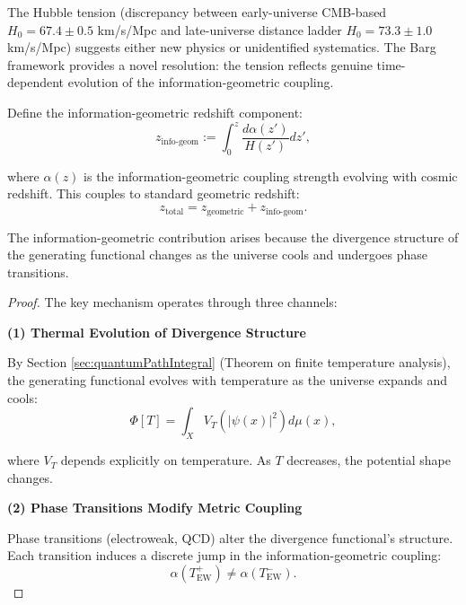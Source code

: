 \begin{theorem}
\label{thm:hubbleTensionResolution}

The Hubble tension (discrepancy between early-universe CMB-based $H_0 = 67.4 \pm 0.5$ km/s/Mpc and late-universe distance ladder $H_0 = 73.3 \pm 1.0$ km/s/Mpc) suggests either new physics or unidentified systematics. The Barg framework provides a novel resolution: the tension reflects genuine time-dependent evolution of the information-geometric coupling.

\begin{definition}

Define the information-geometric redshift component:
\begin{equation}
z_{\text{info-geom}} := \int_0^z \frac{d\alpha(z')}{H(z')} dz',
\end{equation}

where $\alpha(z)$ is the information-geometric coupling strength evolving with cosmic redshift. This couples to standard geometric redshift:
\begin{equation}
z_{\text{total}} = z_{\text{geometric}} + z_{\text{info-geom}}.
\end{equation}

The information-geometric contribution arises because the divergence structure of the generating functional changes as the universe cools and undergoes phase transitions.

\end{definition}

\begin{proof}

The key mechanism operates through three channels:

\textbf{(1) Thermal Evolution of Divergence Structure}

By Section \ref{sec:quantumPathIntegral} (Theorem on finite temperature analysis), the generating functional evolves with temperature as the universe expands and cools:
\begin{equation}
\Phi[T] = \int_X V_T(|\psi(x)|^2) d\mu(x),
\end{equation}

where $V_T$ depends explicitly on temperature. As $T$ decreases, the potential shape changes.

\textbf{(2) Phase Transitions Modify Metric Coupling}

Phase transitions (electroweak, QCD) alter the divergence functional's structure. Each transition induces a discrete jump in the information-geometric coupling:
\begin{equation}
\alpha(T_{\text{EW}}^+) \neq \alpha(T_{\text{EW}}^-).
\end{equation}


\end{proof}
\end{theorem}
